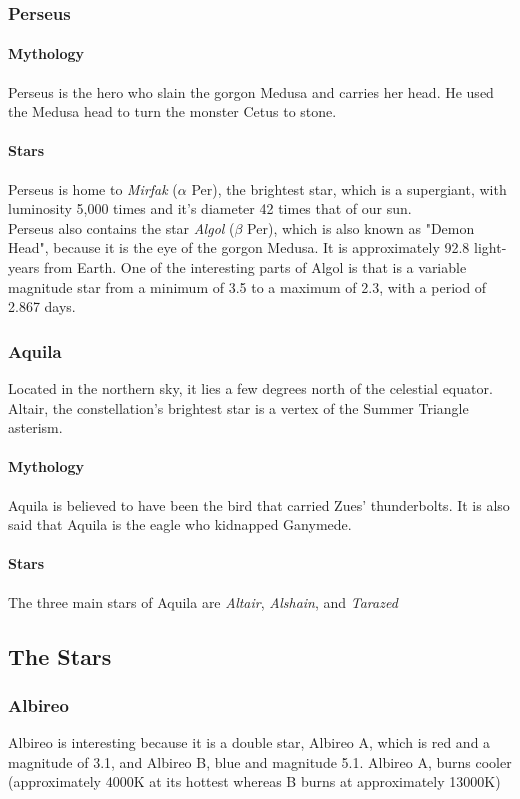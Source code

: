 \documentclass{article}
\begin{document}
\subsubsection{Perseus}
\paragraph{Mythology}
Perseus is the hero who slain the gorgon Medusa and carries her head.  He used the Medusa head to turn the monster Cetus to stone. \cite{perseusmyth} 
\paragraph{Stars}
Perseus is home to \emph{Mirfak} ($\alpha$ Per), the brightest star, which is a supergiant, with luminosity 5,000 times and it's diameter 42 times that of our sun. \\ \cite{perseusstarmap}
Perseus also contains the star \emph{Algol} ($\beta$ Per), which is also known as "Demon Head", because it is the eye of the gorgon Medusa.  It is approximately 92.8 light-years from Earth.  One of the interesting parts of Algol is that is a variable magnitude star from a minimum of 3.5 to a maximum of 2.3, with a period of 2.867 days. \cite{perseus}
\subsubsection{Aquila}
Located in the northern sky, it lies a few degrees north of the celestial equator.  Altair, the constellation's brightest star is a vertex of the Summer Triangle asterism.
\paragraph{Mythology}
Aquila is believed to have been the bird that carried Zues' thunderbolts.  It is also said that Aquila is the eagle who kidnapped Ganymede. 
\paragraph{Stars}
The three main stars of Aquila are \emph{Altair}, \emph{Alshain}, and \emph{Tarazed}
\subsection{The Stars}
\subsubsection{Albireo}
Albireo is interesting because it is a double star, Albireo A, which is red and a magnitude of 3.1, and Albireo B, blue and magnitude 5.1.  Albireo A, burns cooler (approximately 4000K at its hottest whereas B burns at approximately 13000K) 
\end{document}
